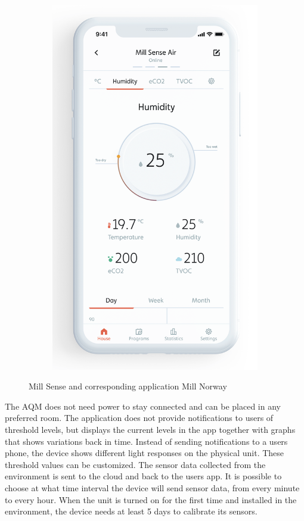 \begin{figure} [H]
\begin{subfigure}{0.3\textwidth}
         \includegraphics[width=1\textwidth]{figures/MillSenseApp.png}
         \label{fig:MillSenseApp}
     \end{subfigure}
     \hfill
        \caption{Mill Sense and corresponding application Mill Norway \cite{MillSense}}
        \label{fig:MillSenseBoth}
\end{figure}

The \gls{AQM} does not need power to stay connected and can be placed in any preferred room. The application does not provide notifications to users of threshold levels, but displays the current levels in the app together with graphs that shows variations back in time. Instead of sending notifications to a users phone, the device shows different light responses on the physical unit. These threshold values can be customized. The sensor data collected from the environment is sent to the cloud and back to the users app. It is possible to choose at what time interval the device will send sensor data, from every minute to every hour. When the unit is turned on for the first time and installed in the environment, the device needs at least 5 days to calibrate its sensors. 

